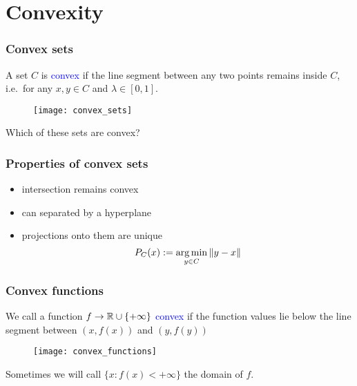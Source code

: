 \documentclass{beamer}
\begin{document}
\section{Convexity}%
\label{sec:}

\begin{frame}
  \frametitle{Convex sets}
  A set $C$ is \textcolor{blue}{convex} if the line segment between any two points remains inside $C$, i.e.\ for any $x,y \in C$ and $\lambda\in [0,1]$.
  \begin{figure}[ht]
    \centering
    \texttt{[image: convex\_sets]}
  \end{figure}
  \begin{center}
    Which of these sets are convex?
  \end{center}

\end{frame}

\begin{frame}
  \frametitle{Properties of convex sets}
  \begin{itemize}
    \item intersection remains convex
    \item can separated by a hyperplane
    \item projections onto them are unique
          \begin{equation}
            P_C(x) := \operatorname*{arg\,min}_{y\in C} \Vert y-x \Vert
          \end{equation}
  \end{itemize}
\end{frame}


\begin{frame}
  \frametitle{Convex functions}
  We call a function $f \to \mathbb{R}\cup\{+\infty\}$ \textcolor{blue}{convex} if the function values lie below the line segment between $(x, f(x))$ and $(y, f(y))$
  \begin{figure}[ht]
    \centering
    \texttt{[image: convex\_functions]}
  \end{figure}

  Sometimes we will call $\{x: f(x)< +\infty \}$ the domain of $f$.

\end{frame}
\end{document}
